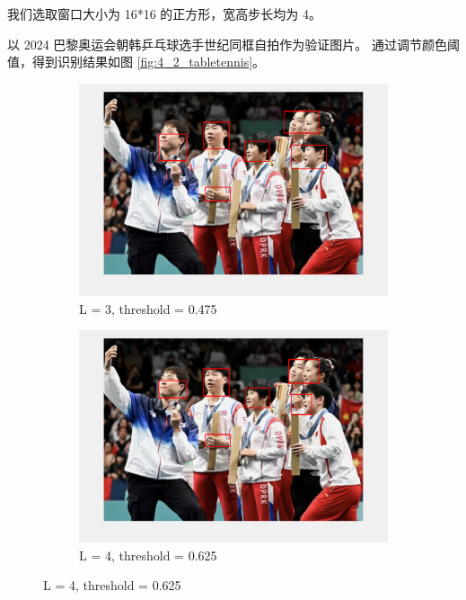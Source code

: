 \documentclass[a4paper]{article}  %
\begin{document}
我们选取窗口大小为 16*16 的正方形，宽高步长均为 4。

以 2024 巴黎奥运会朝韩乒乓球选手世纪同框自拍作为验证图片。
通过调节颜色阈值，得到识别结果如图 \ref{fig:4_2_tabletennis}。

\begin{figure}[ht]
    \centering
    \begin{subfigure}[b]{0.6\textwidth}
        \centering
        \includegraphics[width=\textwidth]{asserts/4_2_tabletennis_L3.png}
        \caption{
            L = 3, threshold = 0.475
        }\label{fig:4_2_tabletennis_L3}
    \end{subfigure}
    \vfill
    \begin{subfigure}[b]{0.6\textwidth}
        \centering
        \includegraphics[width=\textwidth]{asserts/4_2_tabletennis_L4.png}
        \caption{
            L = 4, threshold = 0.625
}
\end{subfigure}
\end{figure}
\end{document}
